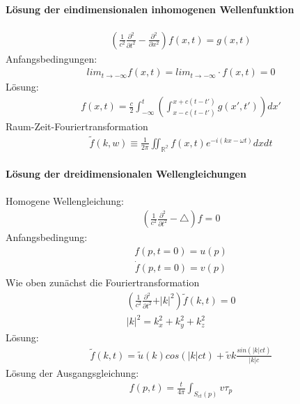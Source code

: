 \documentclass[10pt,a4paper]{article}
\begin{document}
\paragraph{Lösung der eindimensionalen inhomogenen Wellenfunktion} $\,$ \\
\begin{align}
(\frac{1}{c^2} \frac{\partial^2}{\partial t^2} - \frac{\partial^2}{\partial x^2}) f(x,t)=g(x,t)
\end{align}
Anfangsbedingungen:
\begin{align}
lim_{t\longrightarrow - \infty} f(x,t)=lim_{t\longrightarrow - \infty} \cdot{f}(x,t)=0
\end{align}
Lösung:
\begin{align}
f(x,t)= \frac{c}{2} \int_{-\infty}^t(\int_{x-c(t-t')}^{x+c(t-t')} g(x',t'))dx'
\end{align}
Raum-Zeit-Fouriertransformation
\begin{align}
\tilde{f}(k,w)\equiv \frac{1}{2 \pi} \iint_{\mathbb{R^2}} f(x,t) e^{-i(kx-\omega t)} dxdt
\end{align}
\paragraph{Lösung der dreidimensionalen Wellengleichungen} $\,$\\
Homogene Wellengleichung:
\begin{align}
(\frac{1}{c^2} \frac{\partial^2}{\partial t^2}- \triangle)f=0
\end{align}
Anfangsbedingung:
\begin{align}
f(p,t=0)=u(p)
\end{align}
\begin{align}
\dot{f}(p,t=0)=v(p)
\end{align}
Wie oben zunächst die Fouriertransformation
\begin{align}
(\frac{1}{c^2} \frac{\partial^2}{\partial t^2}+ \vert k \vert^2)\tilde{f}(k,t)=0 \\
\vert k \vert^2=k_x^2+k_y^2+k_z^2
\end{align}
Lösung:
\begin{align}
\tilde{f}(k,t)= \tilde{u} (k) cos( \vert k \vert ct)+ \tilde{v}k \frac{sin(\vert k \vert ct)}{\vert k \vert c}
\end{align}
Lösung der Ausgangsgleichung:
\begin{align}
f(p,t)=\frac{t}{4 \pi} \int_{S_{ct}(p)} v \tau_p
\end{align}
\end{document}
